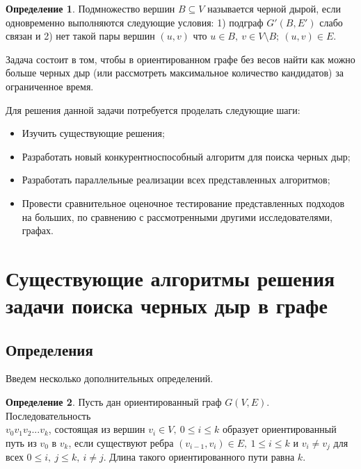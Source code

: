 \documentclass[12pt,a4paper,oneside,openany]{article}
\theoremstyle{definition}
\newtheorem{definition}{Определение}[]
\theoremstyle{lemma}
\theoremstyle{remark}
\begin{document}
\begin{definition}\label{def:blackhole}
Подмножество вершин $B \subseteq V$ называется черной дырой, если одновременно выполняются следующие условия:
1) подграф $G'(B,E')$ слабо связан и 2) нет такой пары вершин $(u,v)$ что $u \in B,\ v \in V\setminus{B};\ (u,v) \in E$.
\end{definition}

Задача состоит в том, чтобы в ориентированном графе без весов найти как можно больше черных дыр (или рассмотреть максимальное количество кандидатов) за ограниченное время.

Для решения данной задачи потребуется проделать следующие шаги:
\begin{itemize}
    \item Изучить существующие решения;
    \item Разработать новый конкурентноспособный алгоритм для поиска черных дыр;
    \item Разработать параллельные реализации всех представленных алгоритмов;
    \item Провести сравнительное оценочное тестирование представленных подходов на больших, по сравнению с рассмотренными другими исследователями, графах.
\end{itemize}

\cleardoublepage

\section{Существующие алгоритмы решения задачи поиска черных дыр в графе}\label{sec:prevsolutions}

\subsection{Определения}\label{sec:definitions}

Введем несколько дополнительных определений.

\begin{definition}\label{def:orpath}
	Пусть дан ориентированный граф $G(V,E)$. Последовательность \\ $v_0v_1v_2...v_k$, состоящая из вершин $v_i \in V,\ 0 \leq i \leq k$ образует ориентированный путь из $v_0$ в $v_k$, если существуют ребра $(v_{i-1}, v_i) \in E,\ 1 \leq i \leq k$ и $v_i \neq v_j$ для всех $0 \leq i,\ j \leq k,\ i \neq j$. Длина такого ориентированного пути равна $k$.
\end{definition}
\end{document}
